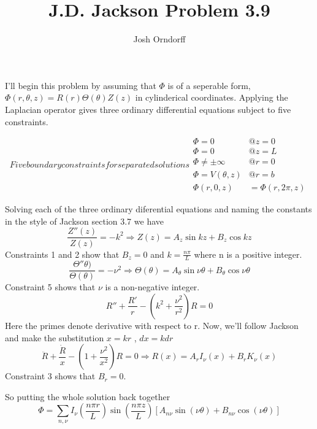 \documentclass[10pt,a4paper]{article}
\begin{document}
\title{J.D. Jackson Problem 3.9}
\author{Josh Orndorff}
\maketitle

I'll begin this problem by assuming that $\Phi$ is of a seperable form, $\Phi (r,\theta,z) = R(r)\Theta(\theta)Z(z)$ in cylinderical coordinates.  Applying the Laplacian operator gives three ordinary differential equations subject to five constraints.

\begin{subequations}
Five boundary constraints for separated solutions
\begin{align}
       \Phi=0 &@ z=0 \\
       \Phi=0 &@ z=L \\
       \Phi\neq \pm\infty &@ r=0 \\
       \Phi=V(\theta,z) &@ r=b \\
       \Phi(r,0,z)&=\Phi(r,2\pi,z)
\end{align}
\end{subequations}

Solving each of the three ordinary diferential equations and naming the constants in the style of Jackson section 3.7 we have
\begin{equation}
\frac{Z''(z)}{Z(z)}=-k^2 \Rightarrow Z(z)=A_z\sin kz + B_z \cos kz
\end{equation}
Constraints 1 and 2 show that $B_z = 0$ and $k=\frac{n\pi}{L}$ where n is a positive integer.
\begin{equation}
\frac{\Theta''\theta)}{\Theta(\theta)}=-\nu^2 \Rightarrow \Theta(\theta)=A_\theta\sin \nu\theta + B_\theta \cos \nu\theta
\end{equation}
Constraint 5 shows that $\nu$ is a non-negative integer.
\begin{equation}
R''+\frac{R'}{r}-\left(k^2+\frac{\nu^2}{r^2}\right)R=0
\end{equation}
Here the primes denote derivative with respect to r.  Now, we'll follow Jackson and make the substitution $x=kr$ , $dx=k dr$
\begin{equation}
\ddot{R}+\frac{\dot{R}}{x}-\left(1+\frac{\nu^2}{x^2}\right)R=0 \Rightarrow R(x)=A_rI_\nu(x)+B_rK_\nu(x)
\end{equation}
Constraint 3 shows that $B_r=0$.

So putting the whole solution back together
\begin{equation}\boxed{
\Phi=\sum_{n, \nu}I_\nu\left(\frac{n\pi r}{L}\right)\sin\left(\frac{n\pi z}{L}\right)
\left[A_{n\nu}\sin(\nu\theta)+B_{n\nu}\cos(\nu\theta)\right]
}\end{equation}
\end{document}
